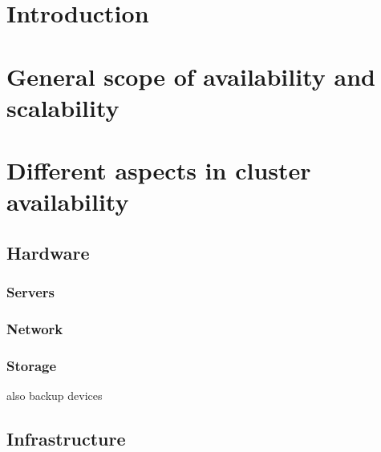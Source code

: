 \documentclass[12pt]{report}
\begin{document}
\newcommand{\treeentry}[2]{%
\draw[->] (#2-1,-\value{treeline}/2) -- (#2-1,-\value{treeline}/2-0.5) -- (#2+0.5,-\value{treeline}/2-0.5) node[right] {#1};
\stepcounter{treeline}
}

\newcommand{\altentry}[2]{%
\draw[->] (#2-1,-\value{treeline}/2) -- (#2-1,-\value{treeline}/2-0.5) -- (#2+0.5,-\value{treeline}/2-0.5) node[right] {#1};
\foreach \x in {1,...,#2}
{   \draw (\x-1,-\value{treeline}/2) -- (\x-1,-\value{treeline}/2-0.5);
}
\stepcounter{treeline}
}


\tableofcontents %

\newpage %

\chapter{Introduction} %

\chapter{General scope of availability and scalability}

\chapter{Different aspects in cluster availability}
\label{chap:aspects}
\section{Hardware}
\subsection{Servers}
\subsection{Network}
\subsection{Storage}
also backup devices
\section{Infrastructure}
\end{document}
